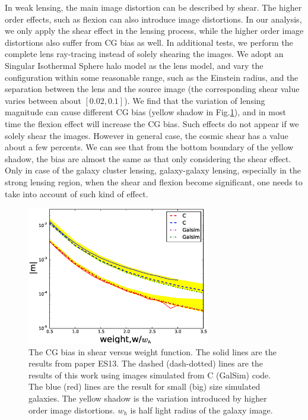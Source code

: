 \documentclass[useAMS,usenatbib]{mn2e}
\begin{document}
In weak lensing, the main image distortion can be described by shear.
The higher order effects, such as flexion
\citep[e.g.][]{2002ApJ...564...65G,bacon2006} can also introduce image
distortions. In our analysis, we only apply the shear effect in the
lensing process, while the higher order image distortions also suffer
from CG bias as well. In additional tests, we perform the complete
lens ray-tracing instead of solely shearing the images. We adopt an
Singular Isothermal Sphere halo model as the lens model, and vary the
configuration within some reasonable range, such as the Einstein
radius, and the separation between the lens and the source image (the
corresponding shear value varies between about $[0.02, 0.1]$). We find
that the variation of lensing magnitude can cause different CG bias
(yellow shadow in Fig.\ref{fig:biasofweight}), and in most time the
flexion effect will increase the CG bias. Such effects do not appear
if we solely shear the images. However in general case, the cosmic
shear has a value about a few percents. We can see that from the
bottom boundary of the yellow shadow, the bias are almost the same as
that only considering the shear effect. Only in case of the galaxy
cluster lensing, galaxy-galaxy lensing, especially in the strong
lensing region, when the shear and flexion become significant, one
needs to take into account of such kind of effect.


%
\begin{figure}
\centerline{\includegraphics[width=8.0cm]{cvsgalsim.eps}}
\caption{The CG bias in shear versus weight function.  The
  solid lines are the results from paper ES13. The dashed
  (dash-dotted) lines are the results of this work using images
  simulated from C (GalSim) code. The blue (red) lines are the result
  for small (big) size simulated galaxies. The yellow shadow is the
  variation introduced by higher order image distortions. $w_h$ is
  half light radius of the galaxy image.}
\label{fig:biasofweight}
\end{figure}
\end{document}
